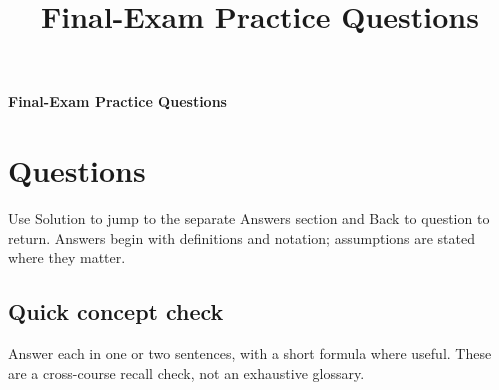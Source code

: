 \documentclass[11pt,a4paper]{article}
\title{\vspace{-1.2cm}\textcolor{statblue}{\textbf{Final-Exam Practice Questions}}}
\author{}
\date{}
\begin{document}
\setlength{\headwidth}{\textwidth}
\begin{center}
{\Large\color{statblue}\bfseries Final-Exam Practice Questions}
\end{center}

\section{Questions}

Use \textcolor{statblue}{Solution} to jump to the separate Answers section
and \textcolor{statblue}{Back to question} to return. Answers begin with
definitions and notation; assumptions are stated where they matter.

\subsection*{Quick concept check}
Answer each in one or two sentences, with a short formula where useful.
These are a cross-course recall check, not an exhaustive glossary.
\end{document}
